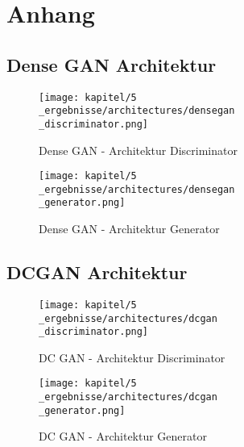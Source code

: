 \chapter{Anhang}
\newpage

\section{Dense GAN Architektur}
\begin{figure}[H]
	\centering
	\texttt{[image: kapitel/5\\\_ergebnisse/architectures/densegan\\\_discriminator.png]}
	\caption{Dense GAN - Architektur Discriminator}
	\label{architecture:densegan-dis}
\end{figure}

\begin{figure}[H]
	\centering
	\texttt{[image: kapitel/5\\\_ergebnisse/architectures/densegan\\\_generator.png]}
	\caption{Dense GAN - Architektur Generator}
	\label{architecture:densegan-gen}
\end{figure}

\section{DCGAN Architektur}

\begin{figure}[H]
	\centering
	\texttt{[image: kapitel/5\\\_ergebnisse/architectures/dcgan\\\_discriminator.png]}
	\caption{DC GAN - Architektur Discriminator}
	\label{architecture:dcgan-dis}
\end{figure}

\begin{figure}[H]
	\centering
	\texttt{[image: kapitel/5\\\_ergebnisse/architectures/dcgan\\\_generator.png]}
	\caption{DC GAN - Architektur Generator}
	\label{architecture:dcgan-gen}
\end{figure}

